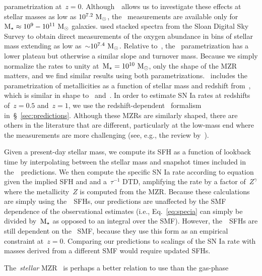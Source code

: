 \documentclass[foo.tex]{subfiles}
\begin{document}
parametrization at~$z = 0$.
Although~\um~allows us to investigate these effects at stellar masses as low as
$10^{7.2}~\msun$, the~\citet{Zahid2014} measurements are available only for
$\mstar \approx 10^9 - 10^{11}~\msun$ galaxies.
\citet{Andrews2013} used stacked spectra from the Sloan Digital Sky Survey
\citep[SDSS;][]{York2000} to obtain direct measurements of the oxygen abundance
in bins of stellar mass extending as low as~$\sim$$10^{7.4}~\msun$.
Relative to~\citet{Zahid2014}, the~\citet{Andrews2013} parametrization has a
lower plateau but otherwise a similar slope and turnover mass.
Because we simply normalize the rates to unity at~$\mstar = 10^{10}~\msun$,
only the shape of the MZR matters, and we find similar results using both
parametrizations.
{\color{red}
\um~includes the parametrization of metallicities as a
function of stellar mass and redshift from~\citet{Maiolino2008}, which is
similar in shape to~\citet{Andrews2013} and~\citet{Zahid2014}.
}%
In order to estimate SN Ia rates at redshifts of~$z = 0.5$ and~$z = 1$,
we use the redshift-dependent~\citet{Zahid2014} formalism
in~\S~\ref{sec:predictions}.
{\color{red}
Although these MZRs are similarly shaped, there are others in the literature
that are different, particularly at the low-mass end where the measurements are
more challenging (see, e.g., the review by~\citealt*{Kewley2019}).
}
\par
Given a present-day stellar mass, we compute its SFH as a function of
lookback time by interpolating between the stellar mass and snapshot times
included in the~\um~predictions.
We then compute the specific SN Ia rate according to equation~
given the implied SFH and and a~$\tau^{-1}$ DTD, amplifying the rate by a
factor of~$Z^\gamma$ where the metallicity~$Z$ is computed from the
\citet{Zahid2014} MZR.
Because these calculations are simply using the~\um~SFHs,
{\color{red} our predictions}
are unaffected by the SMF dependence of the observational estimates (i.e.,
Eq.~\ref{eq:specia} can simply be divided by~$\mstar$ as opposed to an integral
over the SMF).
{\color{red}
However, the~\um~SFHs are still dependent on the~\citet{Baldry2012} SMF,
because they use this form as an empirical constraint at~$z = 0$.
Comparing our predictions to scalings of the SN Ia rate with masses
derived from a different SMF would require updated SFHs.
}
\par
{\color{red}
The~\textit{stellar} MZR~\citep[e.g.,][]{Gallazzi2005,
Kirby2013, Simon2019} is perhaps a better relation to use than the gas-phase
}$$
\end{document}
